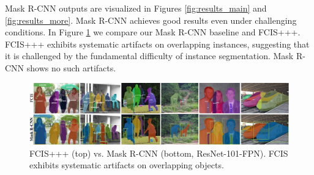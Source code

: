 Mask R-CNN outputs are visualized in Figures \ref{fig:results_main} and \ref{fig:results_more}. Mask R-CNN achieves good results even under challenging conditions. In Figure \ref{fig:results_vs_fcis} we compare our Mask R-CNN baseline and FCIS+++. FCIS+++ exhibits systematic artifacts on overlapping instances, suggesting that it is challenged by the fundamental difficulty of instance segmentation. Mask R-CNN shows no such artifacts.

\begin{figure}[t]
\centering
\includegraphics[width=1.0\linewidth]{figures/mask_rcnn/results_vs_fcis}
\caption{FCIS+++ (top) vs. Mask R-CNN (bottom, ResNet-101-FPN). FCIS exhibits systematic artifacts on overlapping objects.}
\label{fig:results_vs_fcis}
\end{figure}

